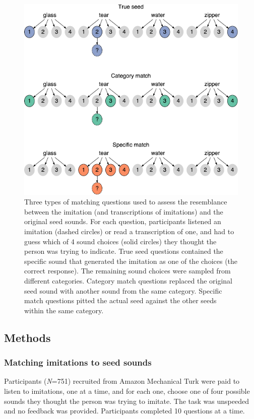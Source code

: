 \documentclass[english,floatsintext,man]{apa6}
\theoremstyle{definition}
\theoremstyle{definition}
\theoremstyle{remark}
\begin{document}
\begin{figure}
\centering
\includegraphics{fig4-1.pdf}
\caption{\label{fig:fig4}Three types of matching questions used to assess
the resemblance between the imitation (and transcriptions of imitations)
and the original seed sounds. For each question, participants listened
an imitation (dashed circles) or read a transcription of one, and had to
guess which of 4 sound choices (solid circles) they thought the person
was trying to indicate. True seed questions contained the specific sound
that generated the imitation as one of the choices (the correct
response). The remaining sound choices were sampled from different
categories. Category match questions replaced the original seed sound
with another sound from the same category. Specific match questions
pitted the actual seed against the other seeds within the same
category.}
\end{figure}

\subsection{Methods}\label{methods-1}

\subsubsection{Matching imitations to seed
sounds}\label{matching-imitations-to-seed-sounds}

Participants (\emph{N}=751) recruited from Amazon Mechanical Turk were
paid to listen to imitations, one at a time, and for each one, choose
one of four possible sounds they thought the person was trying to
imitate. The task was unspeeded and no feedback was provided.
Participants completed 10 questions at a time.
\end{document}
